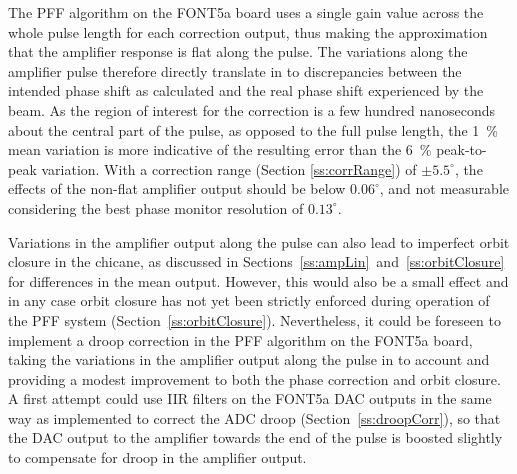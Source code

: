 The PFF algorithm on the FONT5a board uses a single gain value across the whole pulse length for each correction output, thus making the approximation that the amplifier response is flat along the pulse. The variations along the amplifier pulse therefore directly translate in to discrepancies between the intended phase shift as calculated and the real phase shift experienced by the beam. As the region of interest for the correction is a few hundred nanoseconds about the central part of the pulse, as opposed to the full pulse length, the 1~\% mean variation is more indicative of the resulting error than the 6~\% peak-to-peak variation. With a correction range (Section \ref{ss:corrRange}) of \(\pm5.5^\circ\), the effects of the non-flat amplifier output should be below \(0.06^\circ\), and not measurable considering the best phase monitor resolution of \(0.13^\circ\). 

Variations in the amplifier output along the pulse can also lead to imperfect orbit closure in the chicane, as discussed in Sections~\ref{ss:ampLin}~and~\ref{ss:orbitClosure} for differences in the mean output. However, this would also be a small effect and in any case orbit closure has not yet been strictly enforced during operation of the PFF system (Section~\ref{ss:orbitClosure}). Nevertheless, it could be foreseen to implement a droop correction in the PFF algorithm on the FONT5a board, taking the variations in the amplifier output along the pulse in to account and providing a modest improvement to both the phase correction and orbit closure. A first attempt could use IIR filters on the FONT5a DAC outputs in the same way as implemented to correct the ADC droop (Section~\ref{ss:droopCorr}), so that the DAC output to the amplifier towards the end of the pulse is boosted slightly to compensate for droop in the amplifier output.


